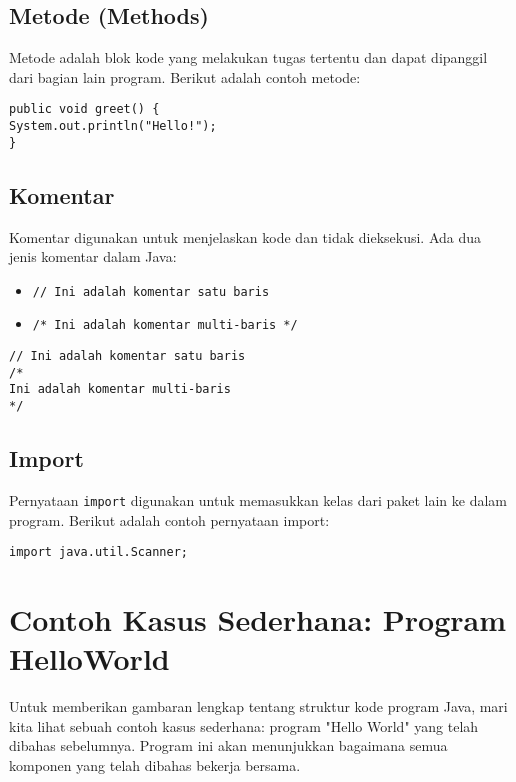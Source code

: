 \subsection{Metode (Methods)}

Metode adalah blok kode yang melakukan tugas tertentu dan dapat dipanggil dari bagian lain program. Berikut adalah contoh metode:

\begin{lstlisting}[style=JavaStyle]
public void greet() {
System.out.println("Hello!");
}
\end{lstlisting}

\subsection{Komentar}

Komentar digunakan untuk menjelaskan kode dan tidak dieksekusi. Ada dua jenis komentar dalam Java:

\begin{itemize}
\item \texttt{// Ini adalah komentar satu baris}
\item \texttt{/* Ini adalah komentar multi-baris */}
\end{itemize}

\begin{lstlisting}[style=JavaStyle]
// Ini adalah komentar satu baris
/*
Ini adalah komentar multi-baris
*/
\end{lstlisting}

\subsection{Import}

Pernyataan \texttt{import} digunakan untuk memasukkan kelas dari paket lain ke dalam program. Berikut adalah contoh pernyataan import:

\begin{lstlisting}[style=JavaStyle]
import java.util.Scanner;
\end{lstlisting}

\section{Contoh Kasus Sederhana: Program HelloWorld}

Untuk memberikan gambaran lengkap tentang struktur kode program Java, mari kita lihat sebuah contoh kasus sederhana: program "Hello World" yang telah dibahas sebelumnya. Program ini akan menunjukkan bagaimana semua komponen yang telah dibahas bekerja bersama.

